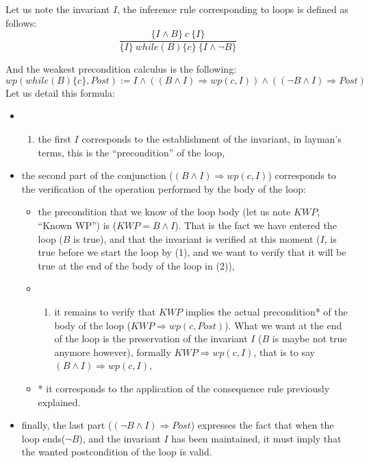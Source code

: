 
Let us note the invariant $I$, the inference rule corresponding to
loops is defined as follows:
$$\dfrac{\{I \wedge B \}\ c\ \{I\}}{\{I\}\ while(B)\{c\}\ \{I \wedge \neg B\}}$$

And the weakest precondition calculus is the following:
$$wp(while (B) \{ c \}, Post) := I \wedge ((B \wedge I) \Rightarrow wp(c, I)) \wedge ((\neg B \wedge I) \Rightarrow Post)$$
Let us detail this formula:

\begin{itemize}
\item
  \begin{enumerate}
  \def\labelenumi{(\arabic{enumi})}
  \item
    the first $I$ corresponds to the establishment of the invariant,
    in layman's terms, this is the ``precondition'' of the loop,
  \end{enumerate}
\item
  the second part of the conjunction
  ($(B \wedge I) \Rightarrow wp(c, I)$) corresponds to the
  verification of the operation performed by the body of the loop:

  \begin{itemize}
  \item
    the precondition that we know of the loop body (let us note $KWP$,
    ``Known WP'') is ($KWP = B \wedge I$). That is the fact we have
    entered the loop ($B$ is true), and that the invariant is verified
    at this moment ($I$, is true before we start the loop by (1), and
    we want to verify that it will be true at the end of the body of the
    loop in (2)),
  \item
    \begin{enumerate}
    \def\labelenumi{(\arabic{enumi})}
    \setcounter{enumi}{1}
    \item
      it remains to verify that $KWP$ implies the actual precondition*
      of the body of the loop ($KWP \Rightarrow wp(c, Post)$). What we
      want at the end of the loop is the preservation of the invariant
      $I$ ($B$ is maybe not true anymore however), formally
      $KWP \Rightarrow wp(c, I)$, that is to say
      $(B \wedge I) \Rightarrow wp(c, I)$,
    \end{enumerate}
  \item
    * it corresponds to the application of the consequence rule
    previously explained.
  \end{itemize}
\item
  finally, the last part ($(\neg B \wedge I) \Rightarrow Post$)
  expresses the fact that when the loop ends($\neg B$), and the
  invariant $I$ has been maintained, it must imply that the wanted
  postcondition of the loop is valid.
\end{itemize}

